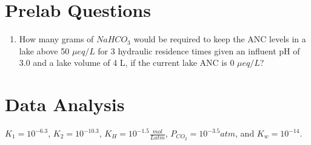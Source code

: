 \documentclass[letterpaper,10pt,english]{sphinxmanual}
\begin{document}
\section{Prelab Questions}
\label{\detokenize{Acid_Rain/Acid_Rain:prelab-questions}}\label{\detokenize{Acid_Rain/Acid_Rain:heading-acid-rain-prelab}}\begin{enumerate}
\item {} 
How many grams of \(NaHCO_3\) would be required to keep the ANC levels in a lake above 50 \(\mu eq/L\) for 3 hydraulic residence times given an influent pH of 3.0 and a lake volume of 4 L, if the current lake ANC is 0 \(\mu eq/L\)?

\end{enumerate}


\section{Data Analysis}
\label{\detokenize{Acid_Rain/Acid_Rain:data-analysis}}\label{\detokenize{Acid_Rain/Acid_Rain:heading-acid-rain-data-analysis}}
\(K_1 = 10^{-6.3}\), \(K_2 = 10^{-10.3}\), \(K_H = 10^{-1.5} \frac{mol}{L atm}\), \(P_{CO_2}=10^{-3.5} atm\), and \(K_w = 10^{-14}\).
\end{document}
